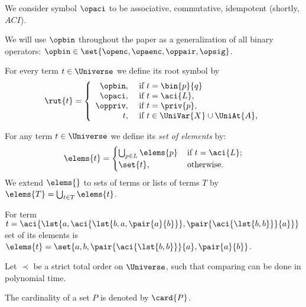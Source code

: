 \begin{df}
We consider symbol $\opaci$ to be 
	associative,
	commutative,
	idempotent
(shortly, $ACI$).
\end{df}

We will use $\opbin$ throughout the paper as a generalization of all binary operators: $\opbin\in\set{\openc,\opaenc,\oppair,\opsig}$.

\begin{df}

 For every term $t\in \Universe$ we define its root symbol by 
\[
 \rut{t} = \left\{ 
 \begin{array}{rl} 
 \opbin, & \mbox{ if } t= \bin{p}{q} \\\opaci, &\mbox{ if } t= \aci{L},\\
 \oppriv, &\mbox{ if } t= \priv{p},\\
 t, &\mbox{ if } t \in \UniVar{X}\cup \UniAt{A},\\
\end{array}
\right. 
\]

\end{df}






\begin{df}\label{def:elems}
	For any term $t\in\Universe$ we define its \emph{set of elements} by:\[
\elems{t} =
 \begin{cases}
 	\bigcup_{p\in L} \elems{p}\, & \mbox{if }  t=\aci{L};\\
  	\set{t} , & \mbox{otherwise. }\\
 \end{cases}
\]
We extend $\elems{}$ to sets of terms or lists of terms $T$ by $\elems{T} = \bigcup_{t\in T} \elems{t}$. 
\end{df}
	
	
\begin{example}\label{ex:term}
 For term $t=\aci{\lst{a, \aci{\lst{b,a,\pair{a}{b}}},\pair{\aci{\lst{b,b}}}{a}}}$
set of its elements is $\elems{t}=\set{a,b,\pair{\aci{\lst{b,b}}}{a},\pair{a}{b}}$.
\end{example}





\begin{df}
Let $\prec$ be a strict total order 
on $\Universe$,
such that comparing can be done in polynomial time. 

\end{df}

\begin{df}
The cardinality of a  set  $P$ is denoted by $\card{P}$.
\end{df}


